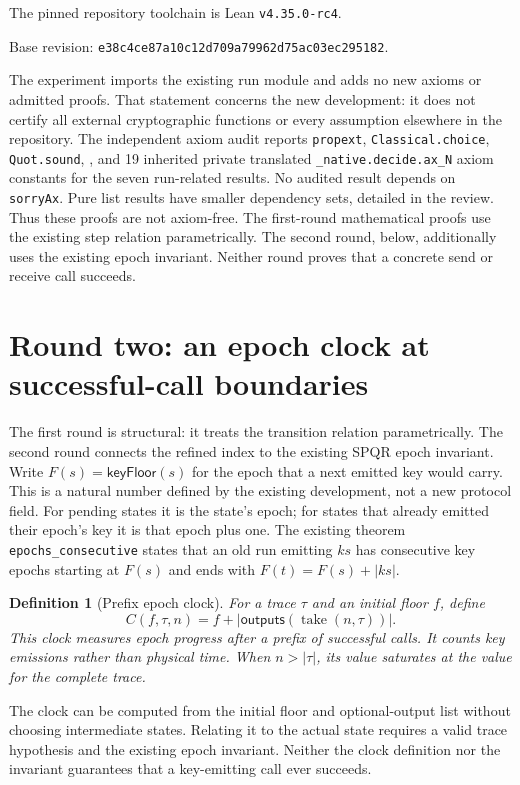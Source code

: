 \documentclass[11pt]{article}
\newtheorem{definition}{Definition}
\newcommand{\erase}{\ensuremath{\mathsf{outputs}}}
\begin{document}
The pinned repository toolchain is Lean \texttt{v4.35.0-rc4}.\par
Base revision: {\small\texttt{e38c4ce87a10c12d709a79962d75ac03ec295182}}.\par
The experiment imports the existing run module and adds no new axioms or admitted proofs.
That statement concerns the new development: it does not certify all external cryptographic
functions or every assumption elsewhere in the repository. The independent axiom audit reports \texttt{propext}, \texttt{Classical.choice},
\texttt{Quot.sound}, , and 19 inherited
private translated \texttt{\_native.decide.ax\_N} axiom constants for the seven run-related
results. No audited result depends on \texttt{sorryAx}. Pure list results have smaller
dependency sets, detailed in the review. Thus these proofs are not axiom-free.
The first-round mathematical proofs use the existing step relation parametrically.
The second round, below, additionally uses the existing epoch invariant. Neither round
proves that a concrete send or receive call succeeds.

\section{Round two: an epoch clock at successful-call boundaries}
The first round is structural: it treats the transition relation parametrically.
The second round connects the refined index to the existing SPQR epoch invariant.
Write $F(s)=\mathsf{keyFloor}(s)$ for the epoch that a next emitted key would carry.
This is a natural number defined by the existing development, not a new protocol field.
For pending states it is the state's epoch; for states that already emitted their epoch's
key it is that epoch plus one. The existing theorem \texttt{epochs\_consecutive} states
that an old run emitting $ks$ has consecutive key epochs starting at $F(s)$ and ends with
$F(t)=F(s)+|ks|$.

\begin{definition}[Prefix epoch clock]
For a trace $\tau$ and an initial floor $f$, define
\[
 C(f,\tau,n)=f+|\erase(\operatorname{take}(n,\tau))|.
\]
This clock measures epoch progress after a prefix of successful calls. It counts key
emissions rather than physical time. When $n>|\tau|$, its value saturates at the value
for the complete trace.
\end{definition}

The clock can be computed from the initial floor and optional-output list without
choosing intermediate states. Relating it to the actual state requires a valid trace
hypothesis and the existing epoch invariant. Neither the clock definition nor the
invariant guarantees that a key-emitting call ever succeeds.
\end{document}

